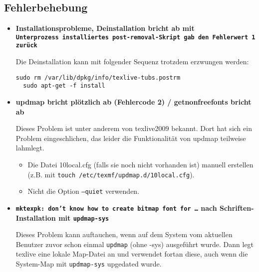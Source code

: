 \newenvironment{knownissue}[1]{%
  \item {\sffamily\bfseries#1}\hfill
  \newcommand{\solution}[1]{\noindent{\itshape ##1}}
}{%
}

\subsection{Fehlerbehebung}

\begin{itemize}

\begin{knownissue}{
  Installationsprobleme, Deinstallation bricht ab mit\\
  \glq\texttt{Unterprozess installiertes post-removal-Skript gab den Fehlerwert 1 zurück}\grq
}
Die Deinstallation kann mit folgender Sequenz trotzdem erzwungen werden:
\begin{lstlisting}[style=cmd]
  sudo rm /var/lib/dpkg/info/texlive-tubs.postrm
  sudo apt-get -f install
\end{lstlisting}


\end{knownissue}


\begin{knownissue}{%
  updmap bricht plötzlich ab (Fehlercode 2) / getnonfreefonts bricht ab
}

Dieses Problem ist unter anderem von texlive2009 bekannt.
Dort hat sich ein Problem eingeschlichen, das leider die Funktionalität von
updmap teilweise lahmlegt.

\solution{Mögliche Lösung:}
\begin{itemize}
  \item Die Datei 10local.cfg (falls sie noch nicht vorhanden ist) manuell
    erstellen (z.B. mit \lstinline{touch /etc/texmf/updmap.d/10local.cfg}).
  \item Nicht die Option \texttt{--quiet} verwenden.
\end{itemize}

\end{knownissue}


\begin{knownissue}{
  \texttt{mktexpk: don't know how to create bitmap font for \ldots}\newline
  nach Schriften-Installation mit \lstinline{updmap-sys}}

Dieses Problem kann auftauchen, wenn auf dem System vom aktuellen Benutzer
zuvor schon einmal \lstinline{updmap} (ohne -sys) ausgeführt wurde.
Dann legt texlive eine lokale Map-Datei an und verwendet fortan diese,
auch wenn die System-Map mit \lstinline{updmap-sys} upgedated wurde.


\end{knownissue}
\end{itemize}
